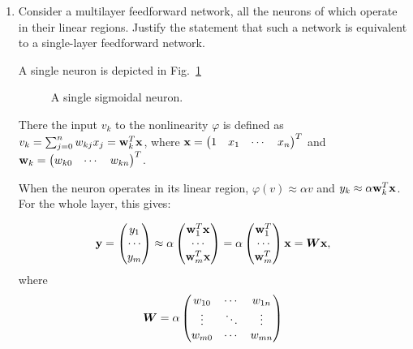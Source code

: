 \begin{enumerate}
\begin{solution}
\begin{enumerate}
    \end{enumerate}

  \end{solution}
  

\item

  Consider a multilayer feedforward network, all the neurons of which
  operate in their linear regions. Justify the statement that such a
  network is equivalent to a single-layer feedforward network.

  \begin{solution}
    A single neuron is depicted in Fig.~\ref{fig:singleneuron}


    \begin{figure}[hb]
      \begin{center}
        
        \caption{\label{fig:singleneuron} A single sigmoidal neuron.}
      \end{center}
    \end{figure}
    
    There the input $v_k$ to the nonlinearity $\varphi$ is defined as
    $v_k = \sum_{j = 0}^n w_{kj}x_j = {\bf{w}}_k^T {\bf{x}}$, \newline
    where ${\bf{x}}=\begin{pmatrix} 1 & x_1 &\cdots & x_n
    \end{pmatrix}^T$ and ${\bf{w}}_k=\begin{pmatrix} w_{k0} &\cdots &
      w_{kn} \end{pmatrix}^T$.

    When the neuron operates in its linear region, $\varphi(v) \approx
    \alpha v$ and $y_k \approx \alpha {\bf{w}}_k^T {\bf{x}}$. For the
    whole layer, this gives: 

    \begin{equation}
      {\bf{y}} = \begin{pmatrix}  y_1 \\ \cdots \\ y_m \end{pmatrix}
      \approx \alpha \begin{pmatrix}  {\bf{w}}_1^T {\bf{x}}\\ \cdots \\
        {\bf{w}}_m^T {\bf{x}} \end{pmatrix} 
      = \alpha \begin{pmatrix}  {\bf{w}}_1^T\\ \cdots \\
        {\bf{w}}_m^T \end{pmatrix} {\bf{x}} = \boldsymbol{W} {\bf{x}},
    \end{equation}
    where
    \begin{equation}
      \boldsymbol{W} = \alpha \begin{pmatrix}
        w_{10} & \cdots & w_{1n} \\ \vdots & \ddots & \vdots \\
        w_{m0} & \cdots & w_{mn} 
      \end{pmatrix}
    \end{equation}
    

\end{solution}
\end{enumerate}
